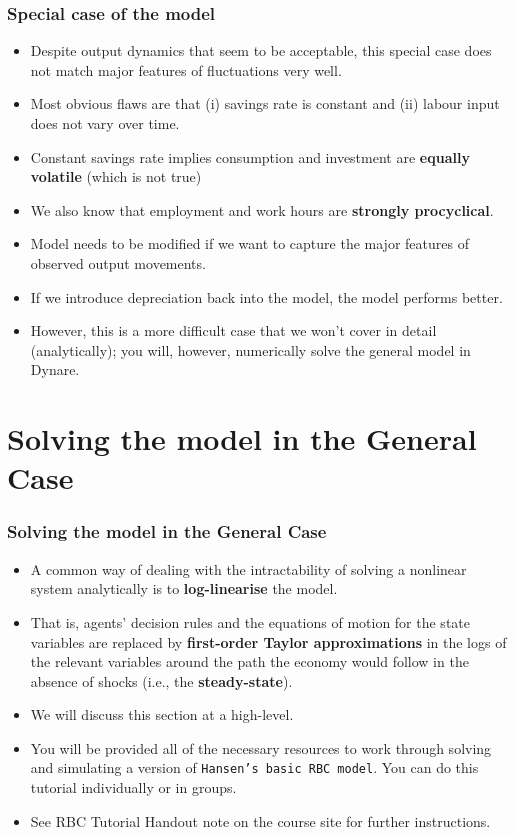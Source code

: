 \documentclass[10pt, handout]{beamer} %
\begin{document}
\begin{frame}
\frametitle{Special case of the model}
\begin{itemize}[<+->]
\item Despite output dynamics that seem to be acceptable, this special case does not match major features of fluctuations very well.
\item Most obvious flaws are that (i) savings rate is constant and (ii) labour input does not vary over time.
\item Constant savings rate implies consumption and investment are \textbf{equally volatile} (which is not true)
\item We also know that employment and work hours are \textbf{strongly procyclical}.
\vspace{2mm}
\item Model needs to be modified if we want to capture the major features of observed output movements.
\item If we introduce depreciation back into the model, the model performs better. 
\item However, this is a more difficult case that we won't cover in detail (analytically); you will, however, numerically solve the general model in Dynare.
\end{itemize}
\end{frame}


\section{Solving the model in the General Case}

\begin{frame}\frametitle{Solving the model in the General Case}
\begin{itemize}
\item A common way of dealing with the intractability of solving a nonlinear system analytically is to \textbf{log-linearise} the model. 
\item That is, agents' decision rules and the equations of motion for the state variables are replaced by \textbf{first-order Taylor approximations} in the logs of the relevant variables around the path
the economy would follow in the absence of shocks (i.e., the \textbf{steady-state}).
\item We will discuss this section at a high-level.
\item You will be provided all of the necessary resources to work through solving and simulating a version of \texttt{Hansen's basic RBC model}. You can do this tutorial individually or in groups.
\item See RBC Tutorial Handout note on the course site for further instructions.
\end{itemize}

\end{frame}
\end{document}
